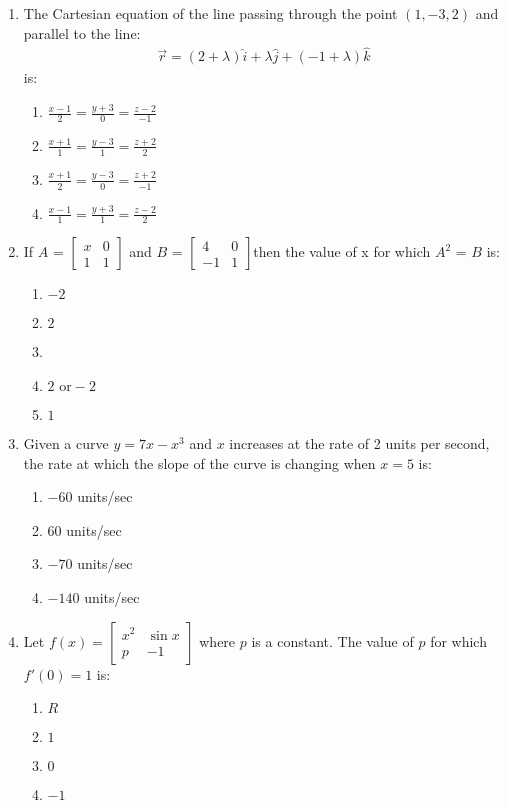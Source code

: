 \documentclass{article}
\providecommand{\myvec}[1]{\ensuremath{\begin{bmatrix}#1\end{bmatrix}}}
\begin{document}
\begin{enumerate}
    \item The Cartesian equation of the line passing through the point $(1, -3, 2)$ and parallel to the line:
   \begin{align}
         \vec{r} = (2 + \lambda)\hat{i} + \lambda \hat{j} + (-1 + \lambda)\hat{k}
   \end{align}
    is:
    \begin{enumerate}[label=(\alph*)]
        \item $\frac{x-1}{2} = \frac{y+3}{0} = \frac{z-2}{-1}$
        \item $\frac{x+1}{1} = \frac{y-3}{1} = \frac{z+2}{2}$
        \item $\frac{x+1}{2} = \frac{y-3}{0} = \frac{z+2}{-1}$
        \item $\frac{x-1}{1} = \frac{y+3}{1} = \frac{z-2}{2}$
    \end{enumerate}
    
    \item If $A$ =  $\myvec{x & 0  \\ 1 & 1 }$ and $B$ = $\myvec{4& 0  \\ -1 & 1 }$then the value of x for which $A^2$ = $B$ is:
    \begin{enumerate}[label=(\alph*)]
        \item $-2$
        \item $2$
        \item \item $2 \text{ or} -2$
        \item $1$
    \end{enumerate}

    \item Given a curve $y = 7x - x^3$ and $x$ increases at the rate of 2 units per second, the rate at which the slope of the curve is changing when $x = 5$ is:
    \begin{enumerate}[label=(\alph*)]
        \item $-60$ units/sec
        \item $60$ units/sec
        \item $-70$ units/sec
        \item $-140$ units/sec
    \end{enumerate}

    \item Let $f(x) = \myvec{x^2 & \sin x \\ p & -1}$ where $p$ is a constant. The value of $p$ for which $f'(0) = 1$ is:
    \begin{enumerate}[label=(\alph*)]
        \item $R$
        \item $1$
        \item $0$
        \item $-1$
    \end{enumerate}


\end{enumerate}
\end{document}
